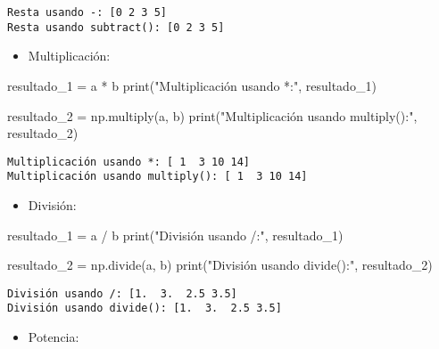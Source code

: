 \documentclass[
  letterpaper,
  DIV=11,
  numbers=noendperiod]{scrreprt}
\newenvironment{Shaded}{\begin{snugshade}}{\end{snugshade}}
\newcommand{\BuiltInTok}[1]{\textcolor[rgb]{0.00,0.23,0.31}{#1}}
\newcommand{\NormalTok}[1]{\textcolor[rgb]{0.00,0.23,0.31}{#1}}
\newcommand{\OperatorTok}[1]{\textcolor[rgb]{0.37,0.37,0.37}{#1}}
\newcommand{\StringTok}[1]{\textcolor[rgb]{0.13,0.47,0.30}{#1}}
\providecommand{\tightlist}{%
  \setlength{\itemsep}{0pt}\setlength{\parskip}{0pt}}\usepackage{longtable,booktabs,array}
\begin{document}
\begin{verbatim}
Resta usando -: [0 2 3 5]
Resta usando subtract(): [0 2 3 5]
\end{verbatim}

\begin{itemize}
\tightlist
\item
  Multiplicación:
\end{itemize}

\begin{Shaded}
\begin{Highlighting}[]
\NormalTok{resultado\_1 }\OperatorTok{=}\NormalTok{ a }\OperatorTok{*}\NormalTok{ b}
\BuiltInTok{print}\NormalTok{(}\StringTok{"Multiplicación usando *:"}\NormalTok{, resultado\_1) }

\NormalTok{resultado\_2 }\OperatorTok{=}\NormalTok{ np.multiply(a, b)}
\BuiltInTok{print}\NormalTok{(}\StringTok{"Multiplicación usando multiply():"}\NormalTok{, resultado\_2) }
\end{Highlighting}
\end{Shaded}

\begin{verbatim}
Multiplicación usando *: [ 1  3 10 14]
Multiplicación usando multiply(): [ 1  3 10 14]
\end{verbatim}

\begin{itemize}
\tightlist
\item
  División:
\end{itemize}

\begin{Shaded}
\begin{Highlighting}[]
\NormalTok{resultado\_1 }\OperatorTok{=}\NormalTok{ a }\OperatorTok{/}\NormalTok{ b}
\BuiltInTok{print}\NormalTok{(}\StringTok{"División usando /:"}\NormalTok{, resultado\_1) }

\NormalTok{resultado\_2 }\OperatorTok{=}\NormalTok{ np.divide(a, b)}
\BuiltInTok{print}\NormalTok{(}\StringTok{"División usando divide():"}\NormalTok{, resultado\_2) }
\end{Highlighting}
\end{Shaded}

\begin{verbatim}
División usando /: [1.  3.  2.5 3.5]
División usando divide(): [1.  3.  2.5 3.5]
\end{verbatim}

\begin{itemize}
\tightlist
\item
  Potencia:
\end{itemize}
\end{document}

